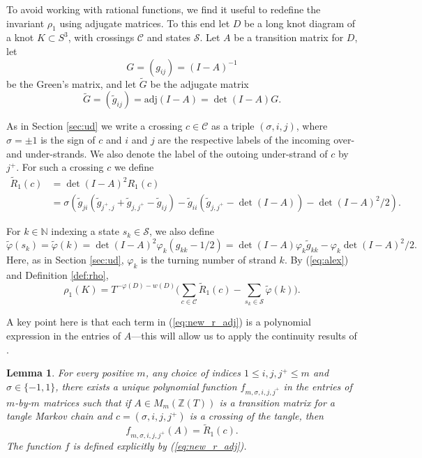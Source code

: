 \documentclass[11pt,hyp,]{nyjm}
\newcommand{\Z}{\mathbb{Z}}
\newcommand{\N}{\mathbb{N}}
\numberwithin{thm}{section}
\newtheorem{lemma}[thm]{Lemma}
\theoremstyle{definition}
\theoremstyle{remark}
\begin{document}
	To avoid working with rational functions, we find it useful to redefine the invariant $\rho_1$ using adjugate matrices. To this end let $D$ be a long knot diagram of a knot $K \subset S^3$, with crossings $\mathcal{C}$ and states $\mathcal{S}$. Let $A$ be a transition matrix for $D$, let
	$$
	G = (g_{ij}) = (I - A)^{-1}
	$$
	be the Green's matrix, and let $\widetilde{G}$ be the adjugate matrix
	$$
	\widetilde{G} = (\tilde{g}_{ij}) = \text{adj}(I - A) = \det(I - A) G.
	$$
	
	As in Section \ref{sec:ud} we write a crossing $c \in \mathcal{C}$ as a triple $(\sigma, i, j)$, where $\sigma = \pm1$ is the sign of $c$ and $i$ and $j$ are the respective labels of the incoming over- and under-strands. We also denote the label of the outoing under-strand of $c$ by $j^+$. For such a crossing $c$ we define
	\begin{align}
		\widetilde{R}_1(c) &= \det(I - A)^2 R_1(c) \nonumber \\
		\label{eq:new_r_adj}
		&= \sigma(\tilde{g}_{ji}(\tilde{g}_{j^+, j} + \tilde{g}_{j, j^+} - \tilde{g}_{ij}) - \tilde{g}_{ii}(\tilde{g}_{j,j^+} - \det(I - A)) - \det(I - A)^2/2).
	\end{align}
	
	For $k \in \N$ indexing a state $s_k \in \mathcal{S}$, we also define
	\begin{equation}
		\label{eq:newphi}
		\tilde{\varphi}(s_k) = \tilde{\varphi}(k) =  \det(I - A)^2 \varphi_k (g_{kk} - 1/2) = \det(I - A) \varphi_k \tilde{g}_{kk} - \varphi_k\det(I - A)^2/2.
	\end{equation}
	Here, as in Section \ref{sec:ud}, $\varphi_k$ is the turning number of strand $k$. By (\ref{eq:alex}) and Definition \ref{def:rho},
	\begin{equation}
		\label{eq:new_rho}
		\rho_1(K) = T^{-\varphi(D) - w(D)} \Big( \sum_{c \in \mathcal{C}} \tilde{R}_1(c) - \sum_{s_k \in \mathcal{S}} \tilde{\varphi}(k) \Big).
	\end{equation}

	A key point here is that each term in (\ref{eq:new_r_adj}) is a polynomial expression in the entries of $A$---this will allow us to apply the continuity results of .
	\begin{lemma}
		\label{lem:polynomial}
		For every positive $m$, any choice of indices $1 \leq i, j, j^+ \leq m$ and $\sigma \in \{-1,1\}$, there exists a unique polynomial function $f_{m,\sigma,i,j,j^+}$ in the entries of $m$-by-$m$ matrices such that if $A \in M_m(\Z(T))$ is a transition matrix for a tangle Markov chain and $c = (\sigma, i, j, j^+)$ is a crossing of the tangle, then
		$$
		f_{m,\sigma,i,j,j^+}(A) = \widetilde{R}_1(c).
		$$
		The function $f$ is defined explicitly by (\ref{eq:new_r_adj}).
	\end{lemma}
\end{document}

